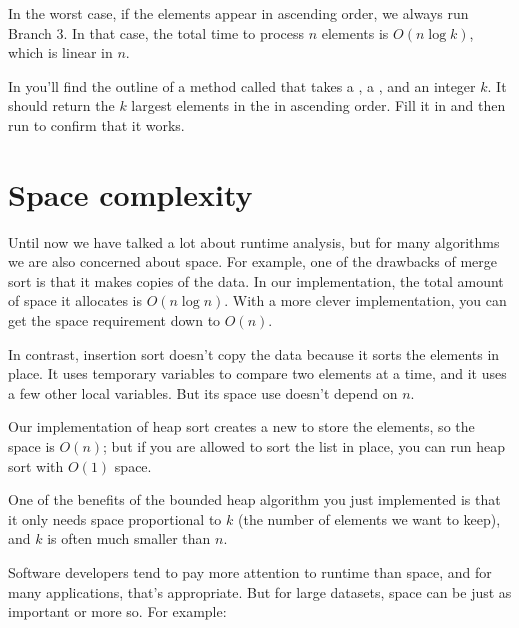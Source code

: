 \documentclass[12pt]{book}
\theoremstyle{exercise}
\begin{document}
In the worst case, if the elements appear in ascending order, we always
run Branch 3. In that case, the total time to process $n$
elements is $O(n \log k)$, which is linear in $n$.


In  you'll find the outline of a method called
 that takes a , a , and an
integer $k$. It should return the $k$ largest elements in the
 in ascending order. Fill it in and then run  to confirm that it works.



\section{Space complexity}
\label{space-complexity}


Until now we have talked a lot about runtime analysis, but for many
algorithms we are also concerned about space. For example, one of the
drawbacks of merge sort is that it makes copies of the data. In our
implementation, the total amount of space it allocates is
$O(n \log n)$. With a more clever implementation, you can get the
space requirement down to $O(n)$.

In contrast, insertion sort doesn't copy the data because it sorts the
elements in place. It uses temporary variables to compare two elements
at a time, and it uses a few other local variables. But its space use
doesn't depend on $n$.

Our implementation of heap sort creates a new  to
store the elements, so the space is $O(n)$; but if you are
allowed to sort the list in place, you can run heap sort with
$O(1)$ space.

One of the benefits of the bounded heap algorithm you just implemented
is that it only needs space proportional to $k$ (the number of
elements we want to keep), and $k$ is often much smaller than
$n$.

Software developers tend to pay more attention to runtime than space, and
for many applications, that's appropriate. But for large datasets, space
can be just as important or more so. For example:
\end{document}

